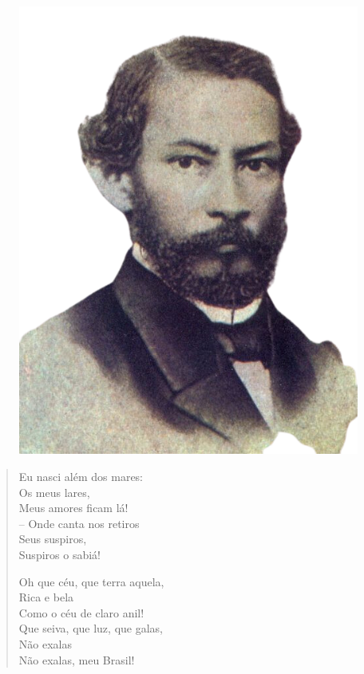 \begin{myquote}
\begin{figure}[H]
\centering
\includegraphics[scale=0.25]{./imgSAEB_7_POR/media/image36.png}
\end{figure}

\begin{verse}

Eu nasci além dos mares: \\
\qquad Os meus lares, \\
Meus amores ficam lá! \\
– Onde canta nos retiros \\
\qquad Seus suspiros, \\
Suspiros o sabiá!

Oh que céu, que terra aquela, \\
\qquad Rica e bela \\
Como o céu de claro anil! \\
Que seiva, que luz, que galas, \\
\qquad Não exalas \\
Não exalas, meu Brasil!


\end{verse}
\end{myquote}
